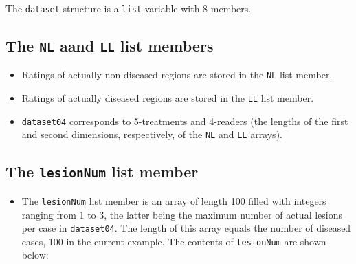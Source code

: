 \documentclass[]{book}
\newenvironment{Shaded}{\begin{snugshade}}{\end{snugshade}}
\newcommand{\CommentTok}[1]{\textcolor[rgb]{0.56,0.35,0.01}{\textit{#1}}}
\newcommand{\DecValTok}[1]{\textcolor[rgb]{0.00,0.00,0.81}{#1}}
\newcommand{\NormalTok}[1]{#1}
\newcommand{\OperatorTok}[1]{\textcolor[rgb]{0.81,0.36,0.00}{\textbf{#1}}}
\providecommand{\tightlist}{%
  \setlength{\itemsep}{0pt}\setlength{\parskip}{0pt}}
\begin{document}
The \texttt{dataset} structure is a \texttt{list} variable with 8 members.

\hypertarget{the-nl-aand-ll-list-members}{%
\subsection{\texorpdfstring{The \texttt{NL} aand \texttt{LL} list members}{The NL aand LL list members}}\label{the-nl-aand-ll-list-members}}

\begin{itemize}
\tightlist
\item
  Ratings of actually non-diseased regions are stored in the \texttt{NL} list member.
\item
  Ratings of actually diseased regions are stored in the \texttt{LL} list member.
\item
  \texttt{dataset04} corresponds to 5-treatments and 4-readers (the lengths of the first and second dimensions, respectively, of the \texttt{NL} and \texttt{LL} arrays).
\end{itemize}

\hypertarget{the-lesionnum-list-member}{%
\subsection{\texorpdfstring{The \texttt{lesionNum} list member}{The lesionNum list member}}\label{the-lesionnum-list-member}}

\begin{itemize}
\tightlist
\item
  The \texttt{lesionNum} list member is an array of length 100 filled with integers ranging from 1 to 3, the latter being the maximum number of actual lesions per case in \texttt{dataset04}. The length of this array equals the number of diseased cases, 100 in the current example. The contents of \texttt{lesionNum} are shown below:
\end{itemize}

\begin{Shaded}
\end{Shaded}
\end{document}
